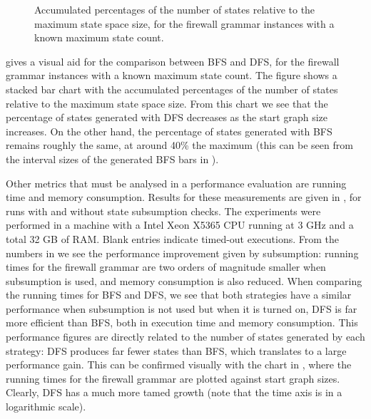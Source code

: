 \begin{figure}[t]
\centering
{}
\vspace{-2ex}
\caption{Accumulated percentages of the number of states relative to the
maximum state space size, for the firewall grammar instances with a known
maximum state count.}
\end{figure}

 gives a visual aid for the comparison between BFS and
DFS, for the firewall grammar instances with a known maximum state count. The
figure shows a stacked bar chart with the accumulated percentages of the number
of states relative to the maximum state space size. From this chart we see that
the percentage of states generated with DFS decreases as the start graph size
increases. On the other hand, the percentage of states generated with BFS
remains roughly the same, at around 40\% the maximum (this can be seen from the
interval sizes of the generated BFS bars in ).

Other metrics that must be analysed in a performance evaluation are running time
and memory consumption. Results for these measurements are given in ,
for runs with and without state subsumption checks. The experiments were
performed in a machine with a Intel Xeon X5365 CPU running at 3 GHz and a total
32 GB of RAM. Blank entries indicate timed-out executions. From the numbers in
 we see the performance improvement given by subsumption: running
times for the firewall grammar are two orders of magnitude smaller when
subsumption is used, and memory consumption is also reduced. When comparing the
running times for BFS and DFS, we see that both strategies have a similar
performance when subsumption is not used but when it is turned on, DFS is far
more efficient than BFS, both in execution time and memory consumption. This
performance figures are directly related to the number of states generated by
each strategy: DFS produces far fewer states than BFS, which translates to a
large performance gain. This can be confirmed visually with the chart in
, where the running times for the firewall grammar are plotted
against start graph sizes. Clearly, DFS has a much more tamed growth (note that
the time axis is in a logarithmic scale).

